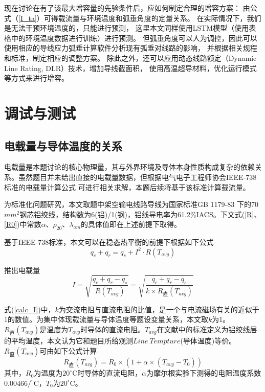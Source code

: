 \documentclass[withoutpreface,bwprint]{cumcmthesis}  %
\begin{document}
        现在讨论在有了该最大增容量的先验条件后，应如何制定合理的增容方案：
        由公式（\ref{I_ta}）可得载流量与环境温度和弧垂角度的定量关系。
        在实际情况下，我们是无法干预环境温度的，只能进行预测，
        这里本文同样使用LSTM模型（使用表格中的环境温度数据进行训练）进行预测。
        但弧垂角度可以人为调控，因此可以使用相应的导线应力弧垂计算软件分析现有弧垂对线路的影响，
        并根据相关规程和标准，制定相应的调整方案。
        除此之外，还可以应用动态线路额定（Dynamic Line Rating, DLR）技术，增加导线截面积，
        使用高温超导材料，优化运行模式等方式来进行增容。
 

	\newpage
	\section {调试与测试}
 
	\subsection {电载量与导体温度的关系}
        
        电载量是本题讨论的核心物理量，其与外界环境及导体本身性质构成复杂的依赖关系。虽然题目并未给出直接的电载量数据，但根据电气电子工程师协会IEEE-738标准的电载量计算公式\textsuperscript{\cite{ref1}}
        可进行相关求解，本题后续将基于该标准计算载流量。

        为标准化问题研究，本文取题中架空输电线路导线为国家标准GB 1179-83\textsuperscript{\cite{ref2}}
        下的70$mm^{2}$钢芯铝绞线，结构数为6(铝)/1(钢)，铝线导电率为61.2\%IACS。下文式(\ref{R}、\ref{R0})中常数$\alpha $、$\rho _{20}$、$\lambda_{am}$的具体值即在上述前提下取得。
        
        基于IEEE-738标准，本文可以在稳态热平衡的前提下根据如下公式
        \begin{equation}
            q_{c}+q_{r}=q_{s}+I^2\cdot R(T_{avg})
        \end{equation}
        
        推出电载量
        \begin{equation}
            I=\sqrt{\frac{q_c+q_r-q_s}{R\left( T_{avg} \right)}}=\sqrt{\frac{q_c+q_r-q_s}{k\times R_{\text{直}}(T_{avg})}}
            \label{calc_I}
        \end{equation}
        
        式(\ref{calc_I})中，$k$为交流电阻与直流电阻的比值，是一个与电流磁场有关的近似于1的数值。为集中体现载流量与导体温度等题设变量关系，本文取$k$为1。$R_{\text{直}}(T_{avg})$是温度为$T_{avg}$时导体的直流电阻。$T_{avg}$在文献\cite{ref1}中的标准定义为铝绞线层的平均温度，本文认为它和题目所给观测$Line\:Tempture$(导体温度)等价。$R_{\text{直}}(T_{avg})$可由如下公式计算
        \begin{equation}
            R_{\text{直}}(T_{avg})=R_0\times \left( 1+\alpha \times \left( T_{avg}-T_0 \right) \right)  
            \label{R}
        \end{equation}
        其中，$R_0$为温度为$20^\circ$C时导体的直流电阻，$\alpha$为摩尔根实验下测得的电阻温度系数$0.00466/^\circ$C，$T_0$为$20^\circ$C。
        
\end{document}
